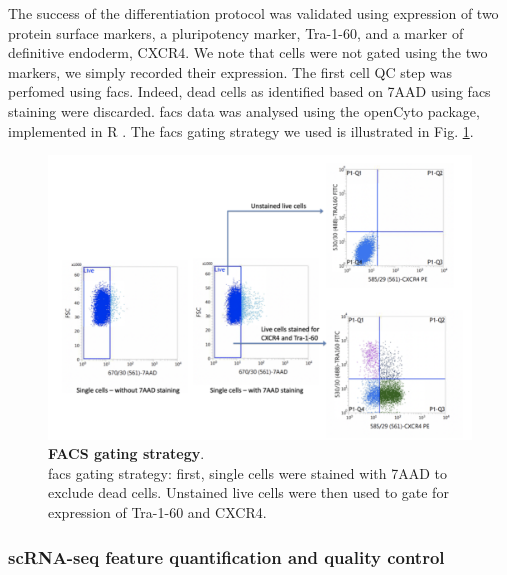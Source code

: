 The success of the differentiation protocol was validated using expression of two protein surface markers, a pluripotency marker, Tra-1-60, and a marker of definitive endoderm, CXCR4. 
We note that cells were not gated using the two markers, we simply recorded their expression. 
The first cell QC step was perfomed using \gls{facs}.
Indeed, dead cells as identified based on 7AAD using \gls{facs} staining were discarded. 
\gls{facs} data was analysed using the openCyto package, implemented in R \cite{finak2014opencyto}.
The \gls{facs} gating strategy we used is illustrated in Fig. \ref{fig:endodiff_facs_strategy}.

\begin{figure}[h]
\centering
\includegraphics[width=14cm]{Chapter4/Fig/endodiff_facs_strategy.png}
\caption[FACS gating strategy]{\textbf{FACS gating strategy}.\\
\gls{facs} gating strategy: first, single cells were stained with 7AAD to exclude dead cells. 
Unstained live cells were then used to gate for expression of Tra-1-60 and CXCR4.}
\label{fig:endodiff_facs_strategy}
\end{figure}


\newpage


\subsubsection{scRNA-seq feature quantification and quality control}

